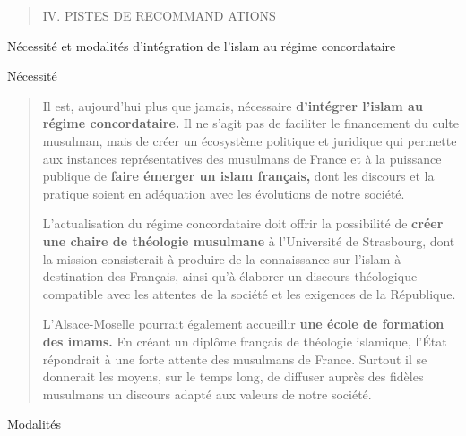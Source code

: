 \begin{quote}
IV. PISTES DE RECOMMAND ATIONS
\end{quote}

Nécessité et modalités d'intégration de l'islam au régime concordataire

Nécessité

\begin{quote}
Il est, aujourd'hui plus que jamais, nécessaire \textbf{d'intégrer
l'islam au régime concordataire.} Il ne s'agit pas de faciliter le
financement du culte musulman, mais de créer un écosystème politique et
juridique qui permette aux instances représentatives des musulmans de
France et à la puissance publique de \textbf{faire émerger un islam
français,} dont les discours et la pratique soient en adéquation avec
les évolutions de notre société.

L'actualisation du régime concordataire doit offrir la possibilité de
\textbf{créer une chaire de théologie musulmane} à l'Université de
Strasbourg, dont la mission consisterait à produire de la connaissance
sur l'islam à destination des Français, ainsi qu'à élaborer un discours
théologique compatible avec les attentes de la société et les exigences
de la République.

L'Alsace-Moselle pourrait également accueillir \textbf{une école de
formation des imams.} En créant un diplôme français de théologie
islamique, l'État répondrait à une forte attente des musulmans de
France. Surtout il se donnerait les moyens, sur le temps long, de
diffuser auprès des fidèles musulmans un discours adapté aux valeurs de
notre société.
\end{quote}

Modalités

